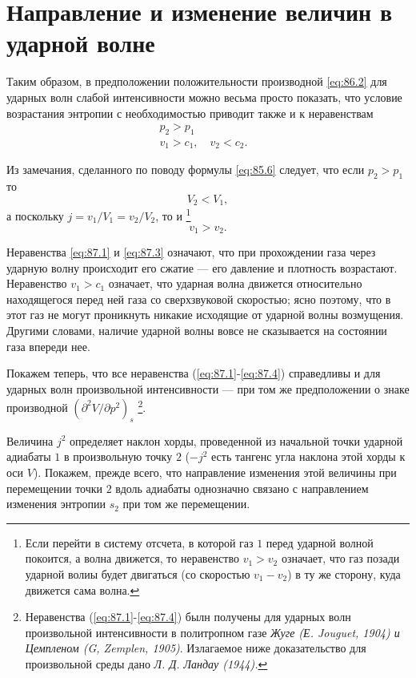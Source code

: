 \section{Направление и изменение величин в ударной волне}\label{sec:p87}

Таким образом, в предположении положительности производной \ref{eq:86.2} для
ударных волн слабой интенсивности можно весьма просто показать, что условие
возрастания энтропии с необходимостью приводит также и к неравенствам
\begin{eqnarray}
\label{eq:87.1}
	p_2 > p_1 & \\
\label{eq:87.2}
	v_1 > c_1, \quad v_2 < c_2.
\end{eqnarray}

Из замечания, сделанного по поводу	формулы \ref{eq:85.6} следует, что если $p_2>p_1$ то
\begin{equation}
	\label{eq:87.3}
	V_2 < V_1,
\end{equation}
а поскольку $j = v_1/V_1 = v_2/V_2$, то и \footnote{Если перейти в систему
отсчета, в которой газ $1$ перед ударной волной покоится, а волна движется, то
неравенство $v_1 > v_2$ означает, что газ позади ударной волиы будет двигаться (со
скоростью $v_1 - v_2$) в ту же сторону, куда движется сама волна.}
\begin{equation}
\label{eq:87.4}
	v_1 > v_2.
\end{equation}

Неравенства \ref{eq:87.1} и \ref{eq:87.3} означают, что при прохождении газа
через ударную волну происходит его сжатие — его давление и плотность
возрастают. Неравенство $v_1>c_1$ означает, что ударная волна движется
относительно находящегося перед ней газа со сверхзвуковой скоростью; ясно
поэтому, что в этот газ не могут проникнуть никакие исходящие от ударной волны
возмущения. Другими словами, наличие ударной волны вовсе не сказывается на
состоянии газа впереди нее.

Покажем теперь, что все неравенства (\ref{eq:87.1}-\ref{eq:87.4}) справедливы и для
ударных волн произвольной интенсивности — при том же предположении о знаке
производной $(\partial^2 V/\partial p^2)_s$ \footnote{Неравенства
(\ref{eq:87.1}-\ref{eq:87.4}) былн получены для ударных волн произвольной
интенсивности в политропном газе \emph{Жуге (Е. Jouguet, 1904) и Цемпленом (G,
Zemplen, 1905)}. Излагаемое ниже доказательство для произвольной среды дано
\emph{Л. Д. Ландау (1944).}}.

Величина $j^2$ определяет наклон хорды, проведенной из начальной точки ударной
адиабаты $1$ в произвольную точку $2$ ($-j^2$ есть тангенс угла наклона этой
хорды к оси $V$). Покажем, прежде всего, что направление изменения этой
величины при перемещении точки $2$ вдоль адиабаты однозначно связано с
направлением изменения энтропии $s_2$ при том же перемещении.


